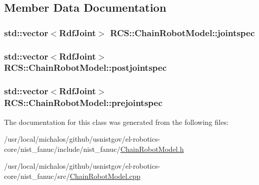 \subsection{Member Data Documentation}
\hypertarget{classRCS_1_1ChainRobotModel_aeac2fe8d84501b374bc2f6170bf751ae}{
\subsubsection[{jointspec}]{\setlength{\rightskip}{0pt plus 5cm}std\-::vector$<${\bf Rdf\-Joint}$>$ R\-C\-S\-::\-Chain\-Robot\-Model\-::jointspec}}\label{classRCS_1_1ChainRobotModel_aeac2fe8d84501b374bc2f6170bf751ae}
\hypertarget{classRCS_1_1ChainRobotModel_a6f2304b0bc530b4a2f67b9932808f510}{
\subsubsection[{postjointspec}]{\setlength{\rightskip}{0pt plus 5cm}std\-::vector$<${\bf Rdf\-Joint}$>$ R\-C\-S\-::\-Chain\-Robot\-Model\-::postjointspec}}\label{classRCS_1_1ChainRobotModel_a6f2304b0bc530b4a2f67b9932808f510}
\hypertarget{classRCS_1_1ChainRobotModel_af7951f5cf300a83c4a5bbe5ef0c42ad1}{
\subsubsection[{prejointspec}]{\setlength{\rightskip}{0pt plus 5cm}std\-::vector$<${\bf Rdf\-Joint}$>$ R\-C\-S\-::\-Chain\-Robot\-Model\-::prejointspec}}\label{classRCS_1_1ChainRobotModel_af7951f5cf300a83c4a5bbe5ef0c42ad1}


The documentation for this class was generated from the following files\-:\begin{DoxyCompactItemize}
\item 
/usr/local/michalos/github/usnistgov/el-\/robotics-\/core/nist\-\_\-fanuc/include/nist\-\_\-fanuc/\hyperlink{ChainRobotModel_8h}{Chain\-Robot\-Model.\-h}\item 
/usr/local/michalos/github/usnistgov/el-\/robotics-\/core/nist\-\_\-fanuc/src/\hyperlink{ChainRobotModel_8cpp}{Chain\-Robot\-Model.\-cpp}\end{DoxyCompactItemize}
